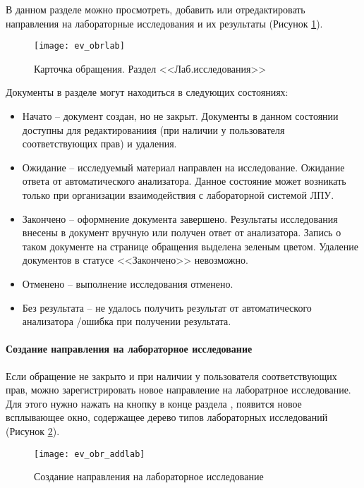 {В данном разделе можно просмотреть, добавить или отредактировать направления на лабораторные исследования и их результаты (Рисунок \ref{img_ev_obrlab}).

\begin{figure}[ht]\centering
 \texttt{[image: ev\_obrlab]}
 \caption{Карточка обращения. Раздел <<Лаб.исследования>>}
 \label{img_ev_obrlab}
\end{figure}

Документы  в разделе  могут находиться в следующих состояниях:
\begin{itemize}
 \item Начато -- документ создан, но не закрыт. Документы в данном состоянии доступны для редактированиия (при наличии у пользователя соответствующих прав) и удаления. 
 \item Ожидание -- исследуемый материал направлен на исследование. Ожидание ответа от автоматического анализатора. Данное состояние может возникать только при организации взаимодействия \tmis с лабораторной системой ЛПУ.
 \item Закончено -- оформнение документа завершено. Результаты исследования внесены в документ вручную или получен ответ от анализатора. Запись о таком документе на странице обращения выделена зеленым цветом. Удаление документов в статусе <<Закончено>> невозможно.
 \item Отменено -- выполнение исследования отменено.
 \item Без результата -- не удалось получить результат от автоматического анализатора \slash ошибка при получении результата.
\end{itemize}

\paragraph{Создание направления на лабораторное исследование}

Если обращение не закрыто и при наличии у пользователя соответствующих прав, можно зарегистрировать новое направление на лаборатрное исследование. Для этого нужно нажать на кнопку  в конце раздела , появится новое всплывающее окно, содержащее дерево типов лабораторных исследований (Рисунок \ref{img_ev_obr_addlab}).

\begin{figure}[ht]\centering
 \texttt{[image: ev\_obr\_addlab]}
 \caption{Создание направления на лабораторное исследование}
 \label{img_ev_obr_addlab}
\end{figure}

}
